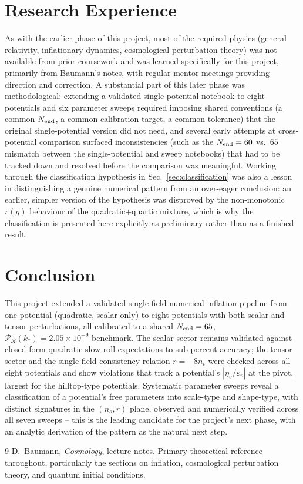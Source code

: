 \documentclass[11pt]{article}
\begin{document}
\section{Research Experience}
As with the earlier phase of this project, most of the required physics (general
relativity, inflationary dynamics, cosmological perturbation theory) was not available
from prior coursework and was learned specifically for this project, primarily from
Baumann's notes, with regular mentor meetings providing direction and correction. A
substantial part of this later phase was methodological: extending a validated
single-potential notebook to eight potentials and six parameter sweeps required
imposing shared conventions (a common $N_{\rm end}$, a common calibration target, a
common tolerance) that the original single-potential version did not need, and several
early attempts at cross-potential comparison surfaced inconsistencies (such as the
$N_{\rm end}=60$ vs.\ $65$ mismatch between the single-potential and sweep notebooks)
that had to be tracked down and resolved before the comparison was meaningful. Working
through the classification hypothesis in Sec.~\ref{sec:classification} was also a
lesson in distinguishing a genuine numerical pattern from an over-eager conclusion: an
earlier, simpler version of the hypothesis was disproved by the non-monotonic $r(g)$
behaviour of the quadratic+quartic mixture, which is why the classification is presented
here explicitly as preliminary rather than as a finished result.

\section{Conclusion}
This project extended a validated single-field numerical inflation pipeline from one
potential (quadratic, scalar-only) to eight potentials with both scalar and tensor
perturbations, all calibrated to a shared $N_{\rm end}=65$, $\mathcal{P}_\mathcal{R}(k_*)=
2.05\times10^{-9}$ benchmark. The scalar sector remains validated against closed-form
quadratic slow-roll expectations to sub-percent accuracy; the tensor sector and the
single-field consistency relation $r=-8n_t$ were checked across all eight potentials and
show violations that track a potential's $|\eta_v/\varepsilon_v|$ at the pivot, largest
for the hilltop-type potentials. Systematic parameter sweeps reveal a classification of
a potential's free parameters into scale-type and shape-type, with distinct signatures in
the $(n_s,r)$ plane, observed and numerically verified across all seven sweeps -- this is
the leading candidate for the project's next phase, with an analytic derivation of the
pattern as the natural next step.

\begin{thebibliography}{9}
 D.~Baumann, \emph{Cosmology}, lecture notes. Primary theoretical
reference throughout, particularly the sections on inflation, cosmological perturbation
theory, and quantum initial conditions.
\end{thebibliography}
\end{document}
